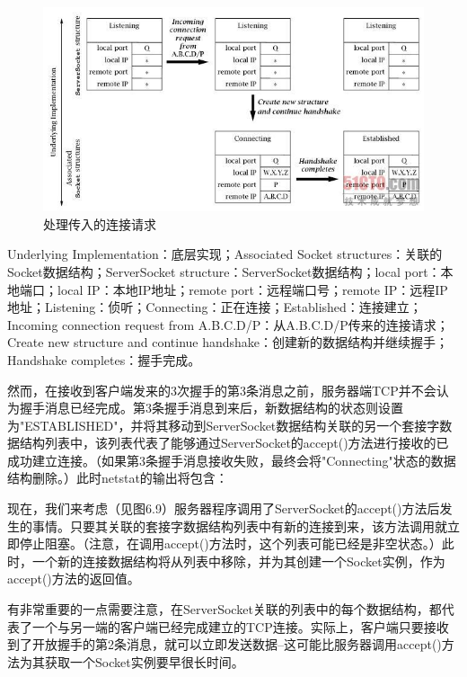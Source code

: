 		\begin{figure}[htbp]%
			\centering
			\includegraphics[scale=.6]{img/06.08.jpg}
			\caption{处理传入的连接请求}
			\label{fig:deal.income.connect.req}
		\end{figure}

		Underlying Implementation：底层实现；Associated Socket structures：关联的Socket数据结构；ServerSocket structure：ServerSocket数据结构；local port：本地端口；local IP：本地IP地址；remote port：远程端口号；remote IP：远程IP地址；Listening：侦听；Connecting：正在连接；Established：连接建立；Incoming connection request from A.B.C.D/P：从A.B.C.D/P传来的连接请求；Create new structure and continue handshake：创建新的数据结构并继续握手；Handshake completes：握手完成。

		然而，在接收到客户端发来的3次握手的第3条消息之前，服务器端TCP并不会认为握手消息已经完成。第3条握手消息到来后，新数据结构的状态则设置为"ESTABLISHED"，并将其移动到ServerSocket数据结构关联的另一个套接字数据结构列表中，该列表代表了能够通过ServerSocket的accept()方法进行接收的已成功建立连接。（如果第3条握手消息接收失败，最终会将"Connecting"状态的数据结构删除。）此时netstat的输出将包含：

		

		现在，我们来考虑（见图6.9）服务器程序调用了ServerSocket的accept()方法后发生的事情。只要其关联的套接字数据结构列表中有新的连接到来，该方法调用就立即停止阻塞。（注意，在调用accept()方法时，这个列表可能已经是非空状态。）此时，一个新的连接数据结构将从列表中移除，并为其创建一个Socket实例，作为accept()方法的返回值。

		有非常重要的一点需要注意，在ServerSocket关联的列表中的每个数据结构，都代表了一个与另一端的客户端已经完成建立的TCP连接。实际上，客户端只要接收到了开放握手的第2条消息，就可以立即发送数据--这可能比服务器调用accept()方法为其获取一个Socket实例要早很长时间。

